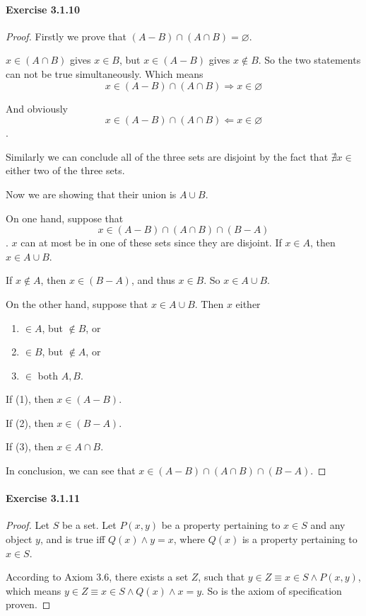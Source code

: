\paragraph{Exercise 3.1.10} \label{exercise3.1.10}
\begin{proof}
Firstly we prove that $(A-B)\cap (A\cap B) = \varnothing$.

$x \in (A\cap B)$ gives $x \in B$, but $x \in (A-B)$ gives $x \notin B$. So the two statements can not 
be true simultaneously. Which means 
\[
x\in (A-B)\cap (A\cap B) \Longrightarrow x \in \varnothing
\]

And obviously 
\[
x\in (A-B)\cap (A\cap B) \Longleftarrow x \in \varnothing
\].

Similarly we can conclude all of the three sets are disjoint by the fact that $\nexists x \in$ either 
two of the three sets.

Now we are showing that their union is $A \cup B$.

On one hand, suppose that 
\[
x \in (A-B)\cap(A\cap B)\cap(B-A)
\].
$x$ can at most be in one of these sets since they are disjoint.
If $x \in A$, then $x \in A \cup B$.

If $x \notin A$, then $x \in (B-A)$, and thus $x \in B$. So $x \in A \cup B$.

On the other hand, suppose that $x \in A \cup B$.
Then $x$ either
\begin{enumerate}
\item $\in A$, but $\notin B$, or
\item $\in B$, but $\notin A$, or
\item $\in$ both $A,B$.
\end{enumerate}

If (1), then $x \in (A-B)$.

If (2), then $x \in (B-A)$.

If (3), then $x \in A\cap B$.

In conclusion, we can see that $x \in (A-B)\cap(A\cap B)\cap(B-A)$.
\end{proof}

\paragraph{Exercise 3.1.11} \label{exercise3.1.11}
\begin{proof}
Let $S$ be a set.
Let $P(x,y)$ be a property pertaining to $x \in S$ and any object $y$, and is true iff 
$Q(x) \wedge y = x$, where $Q(x)$ is a property pertaining to $x \in S$.

According to Axiom 3.6, there exists a set $Z$, such that 
$y \in Z \equiv x \in S \wedge P(x,y)$, which means $y \in Z \equiv x \in S \wedge Q(x) \wedge x = y$. 
So is the axiom of specification proven.
\end{proof}

